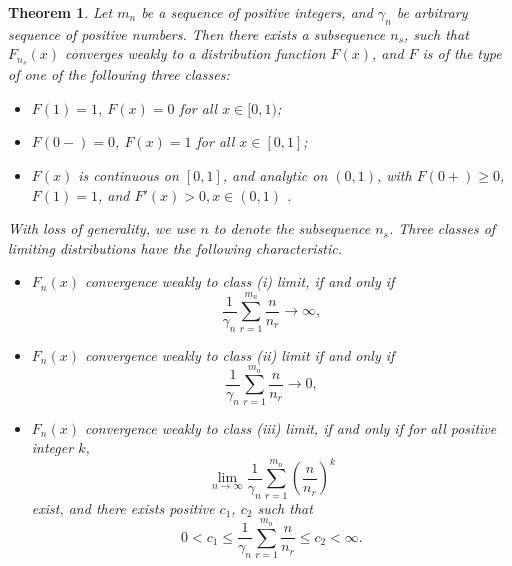 \documentclass[12pt]{article}
\theoremstyle{plain}
\newtheorem{thm}{\textbf{Theorem}}
\theoremstyle{definition}
\theoremstyle{remark}
\begin{document}
\begin{thm}\label{thm:Newclassification}
    Let $m_n$ be a sequence of positive integers, and $\gamma_n$ be arbitrary sequence of positive numbers. 
    Then there exists a subsequence $n_s$, such that $F_{n_s}(x)$ converges weakly to a distribution function $F(x)$, and $F$ is of the type of one of the following three classes:
    \begin{itemize}
    \item[(i).] $F(1)=1$, $F(x)=0$ for all $x\in [0,1)$;
    
    \item[(ii).] $F(0-)=0$, $F(x)=1$ for all $x\in [0,1]$;
    
    \item[(iii).] $F(x)$ is continuous on $[0,1]$, and analytic on $(0,1)$, with $F(0+)\geq0$, 
    $F(1)=1$, and $F'(x)> 0 ,x\in (0,1)$ .
    \end{itemize}
    With loss of generality, we use $n$ to denote the subsequence $n_s$. Three classes of limiting distributions have the following characteristic. 
\begin{itemize}
\item[(a).] $F_n(x)$ convergence weakly to class (i) limit, if and only if 
    \begin{equation*}
    \frac{1}{\gamma_{n}} \sum_{r=1}^{m_n} \frac{n}{n_{r}} \rightarrow \infty,
    \end{equation*}
\item[(b).]
    $F_n(x)$ convergence weakly to class (ii) limit  if and only if
    \begin{equation*}
    \frac{1}{\gamma_{n}} \sum_{r=1}^{m_n} \frac{n}{n_{r}} \rightarrow
    0,
    \end{equation*}
\item[(c).]
    $F_n(x)$ convergence weakly to class (iii) limit, if and only if  for all positive integer $k$, 
    \begin{equation}
     \lim_{n\rightarrow\infty}\frac{1}{\gamma_{n}} \sum_{r=1}^{m_n} \left(\frac{n}{n_{r}}\right)^k
    \end{equation}
    exist, and there exists positive $c_1$, $c_2$ such that
    \begin{equation}
    0< c_1\leq\frac{1}{\gamma_{n}} \sum_{r=1}^{m_n} \frac{n}{n_{r}}\leq c_2<\infty. \end{equation}
\end{itemize}
\end{thm}
\end{document}
